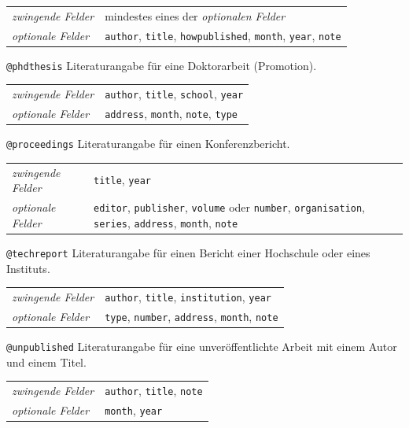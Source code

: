 \documentclass[a4paper,10pt,twoside]{scrbook}
\begin{document}
\begin{tabular}{p{2.8cm}p{10cm}}
	 \textsl{zwingende Felder} & mindestes eines der \textsl{optionalen Felder}\\
	 \textsl{optionale Felder} & \texttt{author}, \texttt{title}, \texttt{howpublished}, \texttt{month}, \texttt{year}, \texttt{note}\\
\end{tabular}

\verb!@phdthesis! Literaturangabe für eine Doktorarbeit (Promotion).

\begin{tabular}{p{3cm}p{9cm}}
	 \textsl{zwingende Felder} & \texttt{author}, \texttt{title}, \texttt{school}, \texttt{year}\\
	 \textsl{optionale Felder} & \texttt{address}, \texttt{month}, \texttt{note}, \texttt{type}\\
\end{tabular}

\verb!@proceedings! Literaturangabe für einen Konferenzbericht.

\begin{tabular}{p{2.8cm}p{10cm}}
	 \textsl{zwingende Felder} & \texttt{title}, \texttt{year}\\
	 \textsl{optionale Felder} & \texttt{editor}, \texttt{publisher}, \texttt{volume} oder \texttt{number}, \texttt{organisation}, \texttt{series}, \texttt{address}, \texttt{month}, \texttt{note} \\
\end{tabular}

\verb!@techreport! Literaturangabe für einen Bericht einer Hochschule oder eines Instituts.

\begin{tabular}{p{2.8cm}p{10cm}}
	 \textsl{zwingende Felder} & \texttt{author}, \texttt{title}, \texttt{institution}, \texttt{year}\\
	 \textsl{optionale Felder} & \texttt{type}, \texttt{number}, \texttt{address}, \texttt{month}, \texttt{note} \\
\end{tabular}

\verb!@unpublished! Literaturangabe für eine unveröffentlichte Arbeit mit einem Autor und einem Titel.

\begin{tabular}{p{2.8cm}p{10cm}}
	 \textsl{zwingende Felder} & \texttt{author}, \texttt{title}, \texttt{note}\\
	 \textsl{optionale Felder} & \texttt{month}, \texttt{year} \\
\end{tabular}
\end{document}
